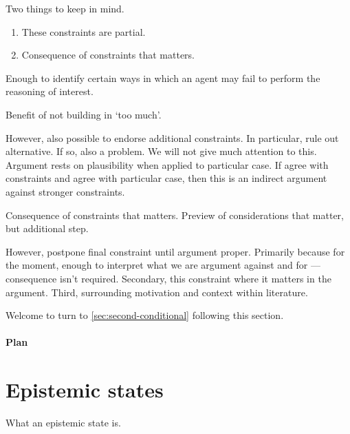 \begin{note}
  Two things to keep in mind.

  \begin{enumerate}
  \item These constraints are partial.
  \item Consequence of constraints that matters.
  \end{enumerate}

  Enough to identify certain ways in which an agent may fail to perform the reasoning of interest.

  Benefit of not building in `too much'.

  However, also possible to endorse additional constraints.
  In particular, rule out alternative.
  If so, also a problem.
  We will not give much attention to this.
  Argument rests on plausibility when applied to particular case.
  If agree with constraints and agree with particular case, then this is an indirect argument against stronger constraints.


  Consequence of constraints that matters.
  Preview of considerations that matter, but additional step.

  However, postpone final constraint until argument proper.
  Primarily because for the moment, enough to interpret what we are argument against and for --- consequence isn't required.
  Secondary, this constraint where it matters in the argument.
  Third, surrounding motivation and context within literature.

  Welcome to turn to \autoref{sec:second-conditional} following this section.
\end{note}

\paragraph{Plan}


\section{Epistemic states}
\label{sec:epistemic-states}

\begin{note}
  What an epistemic state is.
\end{note}

